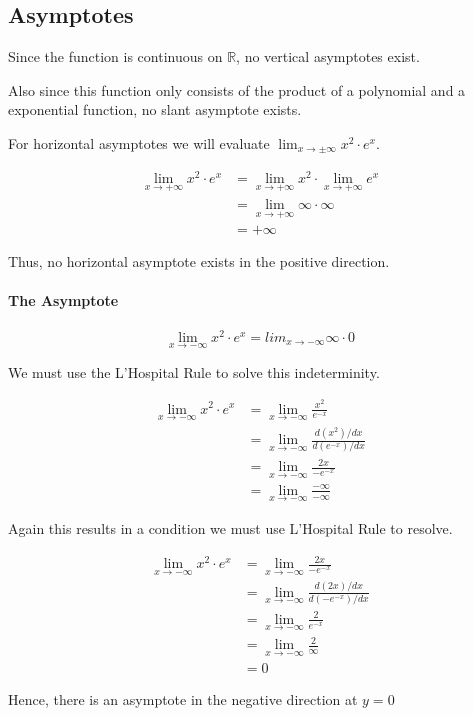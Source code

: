 \subsection{Asymptotes}

Since the function is continuous on \(\mathbb{R}\), no vertical asymptotes
exist.

Also since this function only consists of the product of a polynomial 
and a exponential function, no slant asymptote exists.

For horizontal asymptotes we will evaluate 
\(\lim_{x \rightarrow \pm\infty} {x^2\cdot e^x}\).

\[
    \begin{aligned}
        \lim_{x\rightarrow +\infty} {x^2 \cdot e^x} &
        = \lim_{x\rightarrow +\infty} {x^2} \cdot 
          \lim_{x\rightarrow +\infty} {e^x} \\
        & = \lim_{x\rightarrow +\infty} \infty \cdot \infty \\
        & = +\infty
    \end{aligned}
\]

Thus, no horizontal asymptote exists in the positive direction.

\paragraph{The Asymptote}
\[
    \lim_{x\rightarrow -\infty} {x^2 \cdot e^x}
    = lim_{x\rightarrow -\infty} {\infty\cdot 0}
\]

We must use the L'Hospital Rule to solve this indeterminity.

\[
    \begin{aligned}
        \lim_{x\rightarrow -\infty} {x^2 \cdot e^x} &
        = \lim_{x\rightarrow -\infty} \frac{x^2}{e^{-x}} \\
        & = \lim_{x\rightarrow -\infty} 
                \frac{ {d(x^2)} / {dx}}
                     { {d(e^{-x})} / {dx}} \\
        & = \lim_{x\rightarrow -\infty}
                \frac{ 2x }
                     { -e^{-x} } \\
        & = \lim_{x\rightarrow -\infty}
                \frac{-\infty}{-\infty}
    \end{aligned}
\]

Again this results in a condition we must use L'Hospital Rule to resolve.

\[
    \begin{aligned}
        \lim_{x\rightarrow -\infty} {x^2 \cdot e^x} &
        = \lim_{x\rightarrow -\infty}
                \frac{ 2x }
                     { -e^{-x} } \\
        & = \lim_{x\rightarrow -\infty}
                 \frac{d(2x)/dx}
                      {d(-e^{-x})/dx} \\
        & = \lim_{x\rightarrow -\infty}
                 \frac{2}
                      {e^{-x}} \\
        & = \lim_{x\rightarrow -\infty}
                \frac{2}
                     {\infty} \\
        & = 0
    \end{aligned}
\]

Hence, there is an asymptote in the negative direction at \(y = 0\)